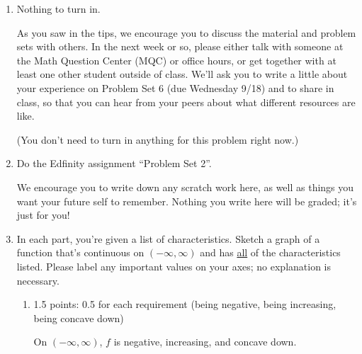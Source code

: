 \documentclass{article}
\newcommand{\doedfinity}[2][\newpage]{
  \begin{problem}[#1]
    Do the Edfinity assignment ``Problem Set #2''.

    We encourage you to write down any scratch work here, as well as
    things you want your future self to remember. Nothing you write
    here will be graded; it's just for you!
  \end{problem}
}
\begin{document}
\begin{enumerate}
\item 

  \begin{grading}
    Nothing to turn in.
  \end{grading}

  As you saw in the tips, we encourage you to discuss the material and problem sets with others. In the next week or so, please either talk with someone at the Math Question Center (MQC) or office hours, or get together with at least one other student outside of class. We'll ask you to write a little about your experience on Problem Set 6 (due Wednesday 9/18) and to share in class, so that you can hear from your peers about what different resources are like.

  (You don't need to turn in anything for this problem right now.)

  \pspace{\newpage}

\item  {}

  \doedfinity{2}

\item %

  In each part, you're given a list of characteristics. Sketch a graph of a function that's continuous on $(-\infty, \infty)$ and has \uline{all} of the characteristics listed. Please label any important values on your axes; no explanation is necessary.

  \begin{enumerate}

  \item

    \begin{grading}
      1.5 points: 0.5 for each requirement (being negative, being increasing, being concave down)
    \end{grading}

    \begin{problem}[\vfill]
      On $(-\infty, \infty)$, $f$ is negative, increasing, and concave down. 
    \end{problem}


\end{enumerate}
\end{enumerate}
\end{document}
